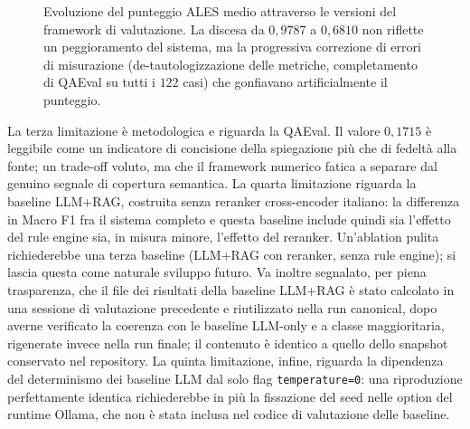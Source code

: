 \begin{figure}[t]
  \centering
  \caption{Evoluzione del punteggio ALES medio attraverso le versioni del framework di valutazione. La discesa da $0{,}9787$ a $0{,}6810$ non riflette un peggioramento del sistema, ma la progressiva correzione di errori di misurazione (de-tautologizzazione delle metriche, completamento di QAEval su tutti i $122$ casi) che gonfiavano artificialmente il punteggio.}
  \label{fig:ales-evol}
\end{figure}

La terza limitazione è metodologica e riguarda la QAEval. Il valore $0{,}1715$ è leggibile come un indicatore di concisione della spiegazione più che di fedeltà alla fonte; un trade-off voluto, ma che il framework numerico fatica a separare dal genuino segnale di copertura semantica. La quarta limitazione riguarda la baseline LLM+RAG, costruita senza reranker cross-encoder italiano: la differenza in Macro F1 fra il sistema completo e questa baseline include quindi sia l'effetto del rule engine sia, in misura minore, l'effetto del reranker. Un'ablation pulita richiederebbe una terza baseline (LLM+RAG con reranker, senza rule engine); si lascia questa come naturale sviluppo futuro. Va inoltre segnalato, per piena trasparenza, che il file dei risultati della baseline LLM+RAG è stato calcolato in una sessione di valutazione precedente e riutilizzato nella run canonical, dopo averne verificato la coerenza con le baseline LLM-only e a classe maggioritaria, rigenerate invece nella run finale; il contenuto è identico a quello dello snapshot conservato nel repository. La quinta limitazione, infine, riguarda la dipendenza del determinismo dei baseline LLM dal solo flag \texttt{temperature=0}: una riproduzione perfettamente identica richiederebbe in più la fissazione del seed nelle option del runtime Ollama, che non è stata inclusa nel codice di valutazione delle baseline.

